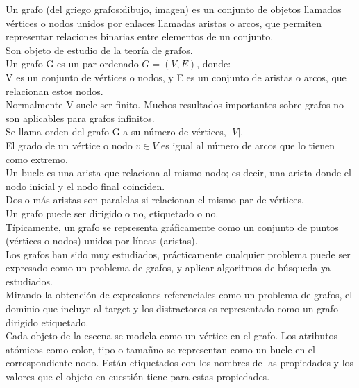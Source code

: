 Un grafo (del griego grafos:dibujo, imagen) es un conjunto de objetos llamados v\'ertices o nodos unidos por enlaces llamadas aristas o arcos, que permiten representar relaciones binarias entre elementos de un conjunto. \\

Son objeto de estudio de la teor\'{i}a de grafos. \\

Un grafo G es un par ordenado $G=(V,E)$, donde:\\

    V es un conjunto de v\'ertices o nodos, y
    E es un conjunto de aristas o arcos, que relacionan estos nodos.\\

Normalmente V suele ser finito. Muchos resultados importantes sobre grafos no son aplicables para grafos infinitos.\\

Se llama orden del grafo G a su n\'umero de v\'ertices, $|V|$.\\

El grado de un v\'ertice o nodo $v \in V$ es igual al n\'umero de arcos que lo tienen como extremo.\\

Un bucle es una arista que relaciona al mismo nodo; es decir, una arista donde el nodo inicial y el nodo final coinciden.\\

Dos o m\'as aristas son paralelas si relacionan el mismo par de v\'ertices.\\

Un grafo puede ser dirigido o no, etiquetado o no.\\

T\'{i}picamente, un grafo se representa gr\'aficamente como un conjunto de puntos (v\'ertices o nodos) unidos por l\'{i}neas (aristas).\\

Los grafos han sido muy estudiados, pr\'acticamente cualquier problema puede ser expresado como un problema de grafos, y aplicar algoritmos de b\'usqueda ya estudiados.\\

Mirando la obtenci\'on de expresiones referenciales como un problema de grafos, el dominio que incluye al target y los distractores es representado como un grafo dirigido etiquetado. \\

Cada objeto de la escena se modela como un v\'ertice en el grafo. Los atributos at\'omicos como color, tipo o tama\~nno se representan como un bucle en el correspondiente nodo. Est\'an etiquetados con los nombres de las propiedades y los valores que el objeto en cuesti\'on tiene para estas propiedades. \\

